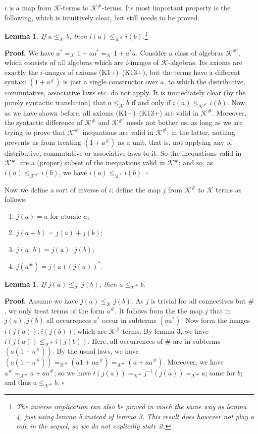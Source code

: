 \documentclass{eptcs}
\newtheorem{lem}[defn]{Lemma}
\newcommand{\proofbeg}{\textbf{Proof. }}
\newcommand{\proofend}{\hfill $\square$}
\newcommand{\KA}{\mathcal{K}}
\begin{document}
$i$ is a map from $\KA$-terms to $\KA^\#$-terms. 
Its most important property is the following, which is
intuitively clear, but still needs to be proved.

\begin{lem}
If $a\leq_\KA b$, then $i(a)\leq_{\KA^\#}i(b)$.\footnote{The inverse
implication can also be proved in much the same way as lemma 4, just using
lemma 5 instead of lemma 3. This result does however not play a 
role in the sequel, so we do not explicitly state it.}
\end{lem}

\proofbeg
We have $a^*=_\KA 1+aa^*=_\KA 1+a^*a$.
Consider a class of algebras $\KA^{\#'}$, which consists of all
algebras which are $i$-images of $\KA$-algebras. 
Its axioms are exactly the $i$-images of
axioms (K1+)--(K13+), but the terms have a different syntax:
$(1+a^\#)$ is just a single constructor over $a$, to which the distributive,
commutative, associative laws etc. do not apply. 
It is immediately clear
(by the purely syntactic translation) that 
$a\leq_\KA b$ if and only if $i(a)\leq_{\KA^{\#'}}i(b)$.
Now, as we have shown before, all axioms (K1+)--(K13+)
are valid in $\KA^{\#}$. Moreover, the syntactic difference
of $\KA^\#$ and $\KA^{\#'}$ needs not bother us, as long as we are
trying to prove that $\KA^{\#'}$ inequations are valid in
$\KA^{\#}$: in the latter, nothing prevents us from treating
$(1+a^\#)$ as a unit, that is, not applying any of distributive,
commutative or associative laws to it. So the inequations valid
in $\KA^{\#'}$ are a (proper) subset of the inequations valid in
$\KA^{\#}$; and so, as $i(a)\leq_{\KA^{\#'}}i(b)$, we have
$i(a)\leq_{\KA^{^\#}}i(b)$.
\proofend

Now we define a sort of inverse of $i$; define the map
$j$ from $\KA^\#$ to $\KA$ terms as follows:
\begin{enumerate}
\item $j(a)=a$ for atomic $a$;
\item $j(a+b)=j(a)+j(b)$;
\item $j(a\cdot b)=j(a)\cdot j(b)$;
\item $j(a^\#)=j(a)(j(a))^*$.
\end{enumerate}



\begin{lem}
If $j(a)\leq_\KA j(b)$, then $a\leq_{\KA^\#}b$.
\end{lem}

\proofbeg
Assume we have $j(a)\leq_\KA j(b)$. As $j$ is trivial for all
connectives but $\#$, we only treat terms of the form $a^\#$. 
It follows from
the the map $j$ that in $j(a),j(b)$ all occurrences $a^*$ occur in 
subterms $(aa^*)$. Now form the images $i(j(a)),i(j(b))$, which are
$\KA^\#$-terms. By lemma 3, we have
$i(j(a))\leq_{\KA^\#}i(j(b))$. Here, all occurrences of $\#$ are in subterms
$(a(1+a^\#))$. By the usual laws, we have
$(a(1+a^\#))=_{\KA^\#}(a1+aa^\#)=_{\KA^\#}(a+aa^\#)$. Moreover, we have 
$a^\#=_{\KA^\#}a+aa^\#$; so we have $i(j(a))=_{\KA^\#}j^{-1}(j(a))=_{\KA^\#}a$; 
same for
$b$; and thus $a\leq_{\KA^\#}b$.
\proofend
\end{document}
